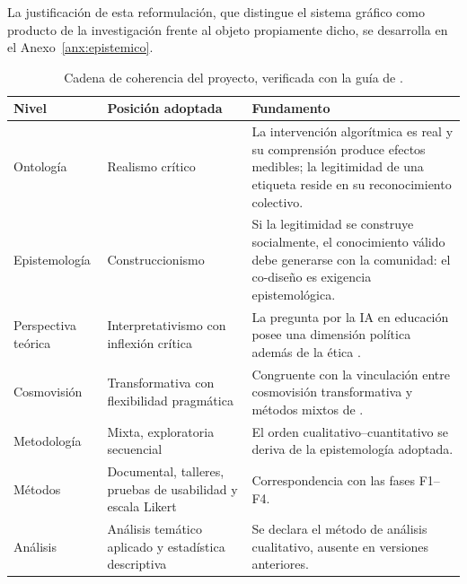 \documentclass[letter,12pt]{article}
\begin{document}
La justificación de esta reformulación, que distingue el sistema gráfico como producto de la investigación frente al objeto propiamente dicho, se desarrolla en el Anexo~\ref{anx:epistemico}.

\begin{table}[H]
\centering
\footnotesize
\caption{Cadena de coherencia del proyecto, verificada con la guía de \citet{moonblackman2014}.}
\label{tab:coherencia}
\renewcommand{\arraystretch}{1.35}
\begin{tabular}{|p{2.9cm}|p{3.5cm}|p{6.2cm}|}
\hline
\rowcolor{bgCotejo}
\textbf{Nivel} & \textbf{Posición adoptada} & \textbf{Fundamento} \\
\hline
Ontología & Realismo crítico & La intervención algorítmica es real y su comprensión produce efectos medibles; la legitimidad de una etiqueta reside en su reconocimiento colectivo. \\
\hline
Epistemología & Construccionismo & Si la legitimidad se construye socialmente, el conocimiento válido debe generarse con la comunidad: el co-diseño es exigencia epistemológica. \\
\hline
Perspectiva teórica & Interpretativismo con inflexión crítica & La pregunta por la IA en educación posee una dimensión política además de la ética \citep{selwyn2022}. \\
\hline
Cosmovisión & Transformativa con flexibilidad pragmática & Congruente con la vinculación entre cosmovisión transformativa y métodos mixtos de \citet{creswell2023}. \\
\hline
Metodología & Mixta, exploratoria secuencial & El orden cualitativo--cuantitativo se deriva de la epistemología adoptada. \\
\hline
Métodos & Documental, talleres, pruebas de usabilidad y escala Likert & Correspondencia con las fases F1--F4. \\
\hline
Análisis & Análisis temático aplicado \citep{guest2012} y estadística descriptiva & Se declara el método de análisis cualitativo, ausente en versiones anteriores. \\
\hline
\end{tabular}
\end{table}
\end{document}
